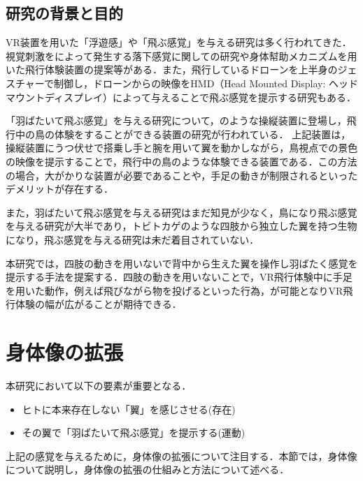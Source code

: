 \begin{small}
\subsection{研究の背景と目的}
    VR装置を用いた「浮遊感」や「飛ぶ感覚」を与える研究は多く行われてきた．視覚刺激をによって発生する落下感覚に関しての研究\cite{奥川夏輝2017VR空間における視覚刺激によって発生する落下感覚の分析}や身体幇助メカニズムを用いた飛行体験装置の提案\cite{鈴木拓馬2014hmd}等がある．また，飛行しているドローンを上半身のジェスチャーで制御し，ドローンからの映像をHMD（Head Mounted Display: ヘッドマウントディスプレイ）によって与えることで飛ぶ感覚を提示する研究\cite{rognon2018flyjacket}もある．


    「羽ばたいて飛ぶ感覚」を与える研究について，のような操縦装置に登場し，飛行中の鳥の体験をすることができる装置の研究が行われている\cite{rheiner2014birdly}\cite{hypersuit}．
    上記装置は，操縦装置にうつ伏せで搭乗し手と腕を用いて翼を動かしながら，鳥視点での景色の映像を提示することで，飛行中の鳥のような体験できる装置である．この方法の場合，大がかりな装置が必要であることや，手足の動きが制限されるといったデメリットが存在する．
    
    また，羽ばたいて飛ぶ感覚を与える研究はまだ知見が少なく，鳥になり飛ぶ感覚を与える研究が大半であり，トビトカゲのような四肢から独立した翼を持つ生物になり，飛ぶ感覚を与える研究は未だ着目されていない．

    本研究では，四肢の動きを用いないで背中から生えた翼を操作し羽ばたく感覚を提示する手法を提案する．四肢の動きを用いないことで，VR飛行体験中に手足を用いた動作，例えば飛びながら物を投げるといった行為，が可能となりVR飛行体験の幅が広がることが期待できる．

\section{身体像の拡張}
  本研究において以下の要素が重要となる．
  \begin{itemize}
      \item ヒトに本来存在しない「翼」を感じさせる(存在)
      \item その翼で「羽ばたいて飛ぶ感覚」を提示する(運動)
  \end{itemize}
  上記の感覚を与えるために，身体像の拡張について注目する．本節では，身体像について説明し，身体像の拡張の仕組みと方法について述べる．


\end{small}
